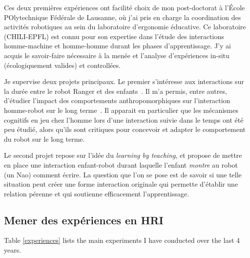 \documentclass[a4paper]{article}
\begin{document}
Ces deux premières expériences ont facilité choix de mon post-doctorat à l'École
POlytechnique Fédérale de Lausanne, où j'ai pris en charge la coordination des
activités robotiques au sein du laboratoire d'ergonomie éducative. Ce
laboratoire (CHILI-EPFL) est connu pour son expertise dans l'étude des
interactions homme-machine et homme-homme durant les phases d'apprentissage. J'y
ai acquis le savoir-faire nécessaire à la menée et l'analyse d'expériences
in-situ (écologiquement valides) et controllées.

Je supervise deux projets principaux. Le premier s'intéresse aux interactions
sur la durée entre le robot Ranger et des enfants~\cite{fink2014which}. Il m'a
permis, entre autres, d'étudier l'impact des comportements anthropomorphiques
sur l'interaction homme-robot sur le long terme~\cite{lemaignan2014dynamics}. Il
apparait en particulier que les mécanismes cognitifs en jeu chez l'homme lors
d'une interaction suivie dans le temps ont été peu étudié, alors qu'ils sont
critiques pour concevoir et adapter le comportement du robot sur le long terme.

Le second projet repose sur l'idée du \emph{learning by teaching}, et propose de
mettre en place une interaction enfant-robot durant laquelle l'enfant
\emph{montre} au robot (un Nao) comment écrire. La question que l'on se pose est
de savoir si une telle situation peut créer une forme interaction originale qui
permette d'établir une relation pérenne et qui soutienne efficacement
l'apprentissage.

\subsection{Mener des expériences en HRI}

Table \ref{experiences} lists the main experiments I have conducted over the
last 4 years.
\end{document}
